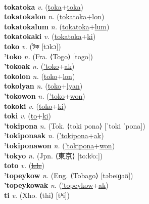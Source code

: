  \label{tokaki} \\
\textbf{tokatoka} \textit{v.} (\hyperref[toka]{toka}+\hyperref[toka]{toka})
 \label{tokatoka} \\
\textbf{tokatokalon} \textit{n.} (\hyperref[tokatoka]{tokatoka}+\hyperref[lon]{lon})
 \label{tokatokalon} \\
\textbf{tokatokalum} \textit{n.} (\hyperref[tokatoka]{tokatoka}+\hyperref[lum]{lum})
 \label{tokatokalum} \\
\textbf{tokatokaki} \textit{v.} (\hyperref[tokatoka]{tokatoka}+\hyperref[ki]{ki})
 \label{tokatokaki} \\
\textbf{toko} \textit{v.} ({\bengali{}টক} [tɔkɔ])
 \label{toko} \\
\textbf{'toko} \textit{n.} (Fra. ⟨Togo⟩ [togo])
 \label{'toko} \\
\textbf{'tokoak} \textit{n.} (\hyperref['toko]{'toko}+\hyperref[ak]{ak})
 \label{'tokoak} \\
\textbf{tokolon} \textit{n.} (\hyperref[toko]{toko}+\hyperref[lon]{lon})
 \label{tokolon} \\
\textbf{tokolyan} \textit{n.} (\hyperref[toko]{toko}+\hyperref[lyan]{lyan})
 \label{tokolyan} \\
\textbf{'tokowon} \textit{n.} (\hyperref['toko]{'toko}+\hyperref[won]{won})
 \label{'tokowon} \\
\textbf{tokoki} \textit{v.} (\hyperref[toko]{toko}+\hyperref[ki]{ki})
 \label{tokoki} \\
\textbf{toki} \textit{v.} (\hyperref[to]{to}+\hyperref[ki]{ki})
 \label{toki} \\
\textbf{'tokipona} \textit{n.} (Tok. ⟨toki pona⟩ [ˈtoki ˈpona])
 \label{'tokipona} \\
\textbf{'tokiponaak} \textit{n.} (\hyperref['tokipona]{'tokipona}+\hyperref[ak]{ak})
 \label{'tokiponaak} \\
\textbf{'tokiponawon} \textit{n.} (\hyperref['tokipona]{'tokipona}+\hyperref[won]{won})
 \label{'tokiponawon} \\
\textbf{'tokyo} \textit{n.} (Jpn. ⟨東京⟩ [toːkʲoː])
 \label{'tokyo} \\
\textbf{toto} \textit{v.} (\hyperref[lele]{\sout{lele}})
 \label{toto} \\
\textbf{'topeykow} \textit{n.} (Eng. ⟨Tobago⟩ [təbeɪɡəʊ])
 \label{'topeykow} \\
\textbf{'topeykowak} \textit{n.} (\hyperref['topeykow]{'topeykow}+\hyperref[ak]{ak})
 \label{'topeykowak} \\
\textbf{ti} \textit{v.} (Xho. ⟨thi⟩ [tʰi])
